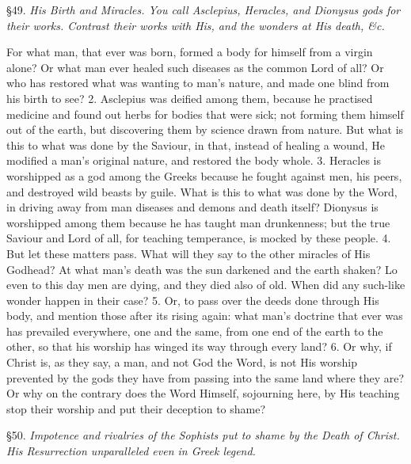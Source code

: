 
§49. \emph{His Birth and Miracles. You call Asclepius, Heracles, and Dionysus gods for their works. Contrast their works with His, and the wonders at His death, \&c.}

For what man, that ever was born, formed a body for himself from a virgin alone? Or what man ever healed such diseases as the common Lord of all? Or who has restored what was wanting to man’s nature, and made one blind from his birth to see? 2. Asclepius was deified among them, because he practised medicine and found out herbs for bodies that were sick; not forming them himself out of the earth, but discovering them by science drawn from nature. But what is this to what was done by the Saviour, in that, instead of healing a wound, He modified a man’s original nature, and restored the body whole. 3. Heracles is worshipped as a god among the Greeks because he fought against men, his peers, and destroyed wild beasts by guile. What is this to what was done by the Word, in driving away from man diseases and demons and death itself? Dionysus is worshipped among them because he has taught man drunkenness; but the true Saviour and Lord of all, for teaching temperance, is mocked by these people. 4. But let these matters pass. What will they say to the other miracles of His Godhead? At what man’s death was the sun darkened and the earth shaken? Lo even to this day men are dying, and they died also of old. When did any such-like wonder happen in their case? 5. Or, to pass over the deeds done through His body, and mention those after its rising again: what man’s doctrine that ever was has prevailed everywhere, one and the same, from one end of the earth to the other, so that his worship has winged its way through every land? 6. Or why, if Christ is, as they say, a man, and not God the Word, is not His worship prevented by the gods they have from passing into the same land where they are? Or why on the contrary does the Word Himself, sojourning here, by His teaching stop their worship and put their deception to shame?


§50. \emph{Impotence and rivalries of the Sophists put to shame by the Death of Christ. His Resurrection unparalleled even in Greek legend.}

